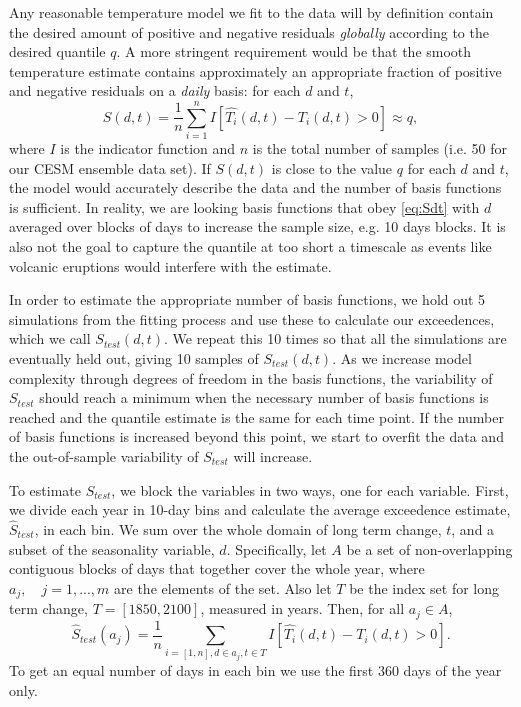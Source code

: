 \documentclass{ametsoc}
\begin{document}
 Any reasonable temperature model we fit to the data will by definition contain the desired amount of positive and negative residuals \emph{globally} according to the desired quantile $q$. A more stringent requirement would be that the smooth temperature estimate contains approximately an appropriate fraction of positive and negative residuals on a \emph{daily} basis: for each $d$ and $t$, 
\begin{equation}
S(d,t) = \frac{1}{n}\sum_{i=1}^n I\left[\hat{T_i}(d,t) - T_i(d,t) > 0\right] \approx q, 
\label{eq:Sdt}	
\end{equation}
 where $I$ is the indicator function and $n$ is the total number of samples (i.e. 50 for our CESM ensemble data set). If $S(d,t)$ is close to the value $q$ for each $d$ and $t$, the model would accurately describe the data and the number of basis functions is sufficient. In reality, we are looking basis functions that obey \ref{eq:Sdt} with $d$ averaged over blocks of days to increase the sample size, e.g. 10 days blocks. It is also not the goal to capture the quantile at too short a timescale as events like volcanic eruptions would interfere with the estimate.

 In order to estimate the appropriate number of basis functions, we hold out 5 simulations from the fitting process and use these to calculate our exceedences, which we call $S_{test}(d,t)$. We repeat this 10 times so that all the simulations are eventually held out, giving 10 samples of $S_{test}(d,t)$. As we increase model complexity through degrees of freedom in the basis functions, the variability of $S_{test}$ should reach a minimum when the necessary number of basis functions is reached and the quantile estimate is the same for each time point. If the number of basis functions is increased beyond this point, we start to overfit the data and the out-of-sample variability of $S_{test}$ will increase. 

To estimate $S_{test}$, we block the variables in two ways, one for each variable. First, we divide each year in 10-day bins and calculate the average exceedence estimate, $\hat{S}_{test}$, in each bin. We sum over the whole domain of long term change, $t$, and a subset of the seasonality variable, $d$. Specifically, let $A$ be a set of non-overlapping contiguous blocks of days that together cover the whole year, where $a_j, \quad j = 1, ..., m$ are the elements of the set. Also let $T$ be the index set for long term change, $T = [1850,2100]$, measured in years. Then, for all  $a_j \in A$,
\begin{equation}
\label{eq:stest}
\hat{S}_{test}(a_j) = \frac{1}{n}\sum_{i=[1,n], d\in a_j, t \in T} I\left[\hat{T_i}(d,t) - T_i(d,t) > 0\right].
\end{equation}
To get an equal number of days in each bin we use the first 360 days of the year only.
\end{document}
